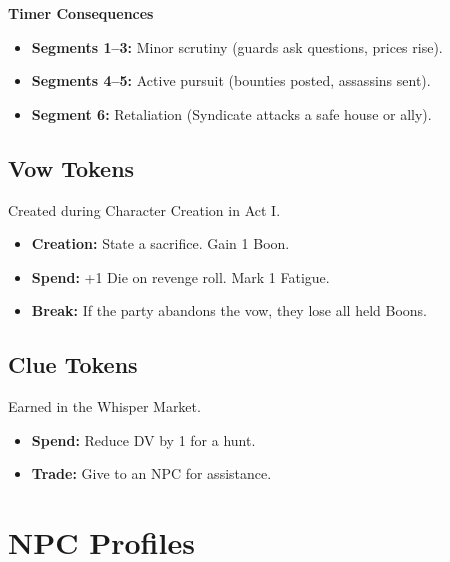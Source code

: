\documentclass[12pt]{book}
\begin{document}
\begin{infobox}
\textbf{Timer Consequences}
\begin{itemize}
    \item \textbf{Segments 1--3:} Minor scrutiny (guards ask questions, prices rise).
    \item \textbf{Segments 4--5:} Active pursuit (bounties posted, assassins sent).
    \item \textbf{Segment 6:} Retaliation (Syndicate attacks a safe house or ally).
\end{itemize}
\end{infobox}

\section{Vow Tokens}

Created during Character Creation in Act I.

\begin{itemize}
    \item \textbf{Creation:} State a sacrifice. Gain 1 Boon.
    \item \textbf{Spend:} +1 Die on revenge roll. Mark 1 Fatigue.
    \item \textbf{Break:} If the party abandons the vow, they lose all held Boons.
\end{itemize}

\section{Clue Tokens}

Earned in the Whisper Market.

\begin{itemize}
    \item \textbf{Spend:} Reduce DV by 1 for a hunt.
    \item \textbf{Trade:} Give to an NPC for assistance.
\end{itemize}

\chapter{NPC Profiles}
\end{document}
